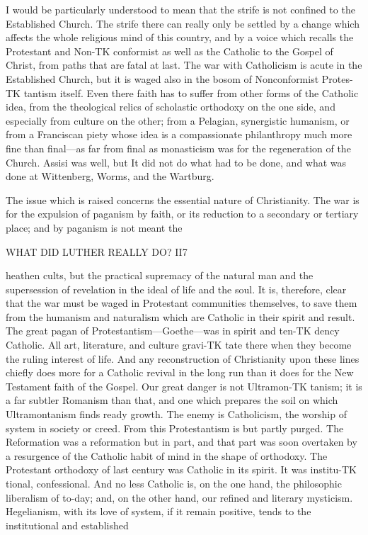 \documentclass[12pt,a5paper,twoside]{book}
\begin{document}
I would be particularly understood to mean that 
the strife is not confined to the Established Church. 
The strife there can really only be settled by a change 
which affects the whole religious mind of this country, 
and by a voice which recalls the Protestant and Non-TK
conformist as well as the Catholic to the Gospel of 
Christ, from paths that are fatal at last. The war with 
Catholicism is acute in the Established Church, but it 
is waged also in the bosom of Nonconformist Protes-TK
tantism itself. Even there faith has to suffer from 
other forms of the Catholic idea, from the theological 
relics of scholastic orthodoxy on the one side, and 
especially from culture on the other; from a Pelagian, 
synergistic humanism, or from a Franciscan piety whose 
idea is a compassionate philanthropy much more fine 
than final---as far from final as monasticism was for 
the regeneration of the Church. Assisi was well, but 
It did not do what had to be done, and what was 
done at Wittenberg, Worms, and the Wartburg. 

The issue which is raised concerns the essential 
nature of Christianity. The war is for the expulsion 
of paganism by faith, or its reduction to a secondary or 
tertiary place; and by paganism is not meant the 



WHAT DID LUTHER REALLY DO? II7 

heathen cults, but the practical supremacy of the natural 
man and the supersession of revelation in the ideal of 
life and the soul. It is, therefore, clear that the war 
must be waged in Protestant communities themselves, 
to save them from the humanism and naturalism which 
are Catholic in their spirit and result. The great pagan 
of Protestantism---Goethe---was in spirit and ten-TK
dency Catholic. All art, literature, and culture gravi-TK
tate there when they become the ruling interest of life. 
And any reconstruction of Christianity upon these 
lines chiefly does more for a Catholic revival in the 
long run than it does for the New Testament faith 
of the Gospel. Our great danger is not Ultramon-TK
tanism; it is a far subtler Romanism than that, and 
one which prepares the soil on which Ultramontanism 
finds ready growth. The enemy is Catholicism, 
the worship of system in society or creed. From this 
Protestantism is but partly purged. The Reformation 
was a reformation but in part, and that part was soon 
overtaken by a resurgence of the Catholic habit of mind 
in the shape of orthodoxy. The Protestant orthodoxy 
of last century was Catholic in its spirit. It was institu-TK
tional, confessional. And no less Catholic is, on the 
one hand, the philosophic liberalism of to-day; and, 
on the other hand, our refined and literary mysticism. 
Hegelianism, with its love of system, if it remain 
positive, tends to the institutional and established 
\end{document}

